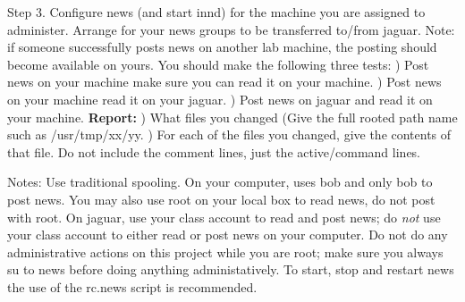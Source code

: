Step 3. Configure news (and start {\ltt{}innd}) for the machine you are
assigned to administer.
Arrange for your news groups to be transferred to/from {\ltt{}jaguar}.
Note: if someone successfully posts news on another lab machine, the posting
should become available on yours.
You should make the following three tests:
\hfill{}) Post news on your machine make sure you can read it
on your machine.
\hfill{}) Post news on your machine read it on your {\ltt{}jaguar}.
\hfill{}) Post news on {\ltt{}jaguar} and read it on your machine.
\hfill\break
{\bf Report:}
\hfill{}) What files you changed (Give the full rooted path name such as
{\ltt{}/usr/tmp/xx/yy}.
\hfill{}) For each of the files you changed, give the contents of that file.
Do not include the comment lines, just the active/command lines.

Notes: Use traditional spooling. On your computer, uses {\ltt{}bob}
and only {\ltt{}bob} to post news. You may also use root on
your local box to read news, do not post with root.
On jaguar, use your class account to read and post news;
do {\it not} use your class account to either read or post news on your
computer. Do not do any administrative actions on this project
while you are root; make sure you always {\ltt{}su} to news before
doing anything administatively. To start, stop and restart news
the use of the {\ltt{}rc.news} script is recommended.
\bye

